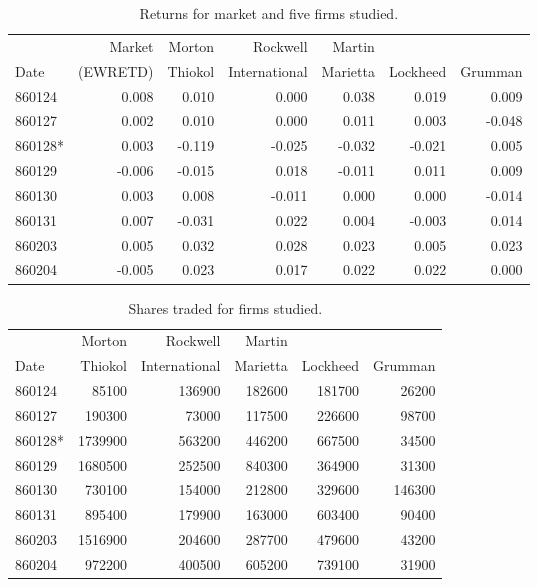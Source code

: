 

\begin{table}[hp]
\caption{Returns for market and five firms studied.}
\begin{tabular*}{6in}{lrrrrrr}
\hline\hline       
       & Market & Morton & Rockwell & Martin &          &         \\
Date   & (EWRETD) & Thiokol & International & Marietta & Lockheed & Grumman \\
\hline
860124 &   0.008 &   0.010 &   0.000 &   0.038 &   0.019 &   0.009 \\
860127 &   0.002 &   0.010 &   0.000 &   0.011 &   0.003 &  -0.048 \\
860128* &   0.003 &  -0.119 &  -0.025 &  -0.032 &  -0.021 &   0.005 \\
860129 &  -0.006 &  -0.015 &   0.018 &  -0.011 &   0.011 &   0.009 \\
860130 &   0.003 &   0.008 &  -0.011 &   0.000 &   0.000 &  -0.014 \\
860131 &   0.007 &  -0.031 &   0.022 &   0.004 &  -0.003 &   0.014 \\
860203 &   0.005 &   0.032 &   0.028 &   0.023 &   0.005 &   0.023 \\
860204 &  -0.005 &   0.023 &   0.017 &   0.022 &   0.022 &   0.000 \\ \hline
\end{tabular*}
\end{table}

\begin{table}[hp]
\caption{Shares traded for firms studied.}
\begin{tabular*}{6in}{lrrrrr}
\hline\hline       
       &  Morton & Rockwell & Martin &          &         \\
Date   &  Thiokol & International & Marietta & Lockheed & Grumman \\
\hline
860124 & 85100 & 136900 & 182600 & 181700 & 26200 \\
860127 & 190300 & 73000 & 117500 & 226600 & 98700 \\
860128* & 1739900 & 563200 & 446200 & 667500 & 34500 \\
860129 & 1680500 & 252500 & 840300 & 364900 & 31300 \\
860130 & 730100 & 154000 & 212800 & 329600 & 146300 \\
860131 & 895400 & 179900 & 163000 & 603400 & 90400 \\
860203 & 1516900 & 204600 & 287700 & 479600 & 43200 \\
860204 & 972200 & 400500 & 605200 & 739100 & 31900 \\ \hline
\end{tabular*}
\end{table}

